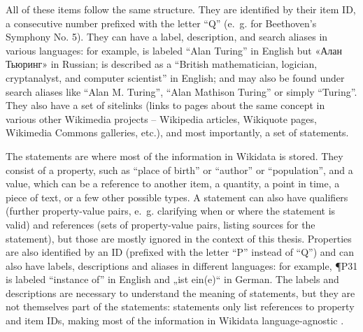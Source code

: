 All of these items follow the same structure.
They are identified by their item ID,
a consecutive number prefixed with the letter “Q”
(e.~g.  for Beethoven’s Symphony No. 5).
They can have a label, description, and search aliases in various languages:
for example,  is labeled “Alan Turing” in English
but «\foreignlanguage{russian}{Алан Тьюринг}» in Russian;
is described as a “British mathematician, logician, cryptanalyst, and computer scientist” in English;
and may also be found under search aliases like “Alan M. Turing”, “Alan Mathison Turing” or simply “Turing”.
They also have a set of sitelinks
(links to pages about the same concept in various other Wikimedia projects –
Wikipedia articles, Wikiquote pages, Wikimedia Commons galleries, etc.),
and most importantly, a set of statements.

The statements are where most of the information in Wikidata is stored.
They consist of a property, such as “place of birth” or “author” or “population”,
and a value, which can be a reference to another item, a quantity, a point in time, a piece of text,
or a few other possible types.
A statement can also have qualifiers
(further property-value pairs, e.~g. clarifying when or where the statement is valid)
and references (sets of property-value pairs, listing sources for the statement),
but those are mostly ignored in the context of this thesis.
Properties are also identified by an ID
(prefixed with the letter “P” instead of “Q”)
and can also have labels, descriptions and aliases in different languages:
for example, \P{P31} is labeled “instance of” in English
and „\foreignlanguage{ngerman}{ist ein(e)}“ in German.
The labels and descriptions are necessary to understand the meaning of statements,
but they are not themselves part of the statements:
statements only list references to property and item IDs,
making most of the information in Wikidata language-agnostic \cite{Kaffee:2017:GBA:3125433.3125465}.


